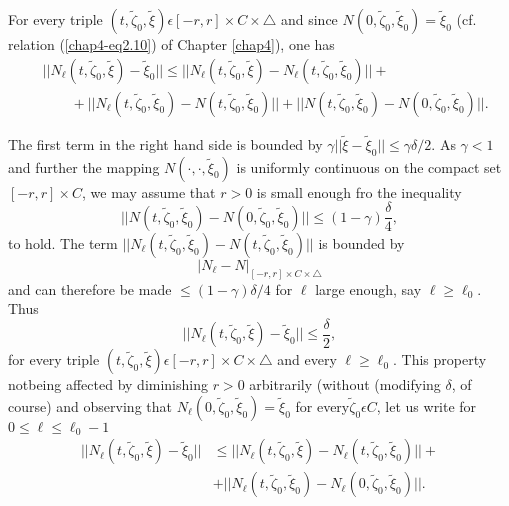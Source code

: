 For every triple $(t,  \widetilde{\zeta}_{0},  \widetilde{\xi})
\epsilon [-r, r] \times C \times \triangle$ and since $N(0,
\widetilde{\zeta}_{0},  \widetilde{\xi}_{0}) =  \widetilde{\xi}_{0}$
(cf. relation (\ref{chap4-eq2.10}) of Chapter \ref{chap4}), one has
\begin{align*}
& ||N_{\ell}(t,  \widetilde{\zeta}_{0},  \widetilde{\xi}) -
\widetilde{\xi}_{0}||  \leq ||N_{\ell}(t,  \widetilde{\zeta}_{0},
\widetilde{\xi}) - N_{\ell}(t,  \widetilde{\zeta}_{0},
\widetilde{\xi}_{0})|| +\\
& \qquad + ||N_{\ell}(t,  \widetilde{\zeta}_{0},  \widetilde{\xi}_{0}) - N (t , \widetilde{\zeta}_0, \widetilde{\xi}_0) || +
||N(t,  \widetilde{\zeta}_{0},  \widetilde{\xi}_{0}) -N(0,
\widetilde{\zeta}_{0},  \widetilde{\xi}_{0})||.
\end{align*}

The first term in the right hand side is bounded by $\gamma ||
\widetilde{\xi} -  \widetilde{\xi}_{0}|| \leq \gamma \delta / 2$. As
$\gamma < 1$ and further the mapping $N(\cdot, \cdot,
\widetilde{\xi}_{0})$ is uniformly continuous on the compact set $[-r,
r] \times C$, we may assume that $r > 0$ is small enough fro the
inequality
$$
||N(t,  \widetilde{\zeta}_{0},  \widetilde{\xi}_{0}) - N(0,
\widetilde{\zeta}_{0},  \widetilde{\xi}_{0})|| \leq (1 - \gamma)
\frac{\delta}{4}, 
$$
to hold. The term $||N_{\ell}(t,  \widetilde{\zeta}_{0},
\widetilde{\xi}_{0}) - N(t, \widetilde{\zeta}_{0},
\widetilde{\xi}_{0})||$ is bounded by 
$$|N_{\ell} - N|_{[-r, r] \times
  C \times \triangle}$$ 
and can therefore be made $\leq (1 -
\gamma)\delta / 4$ for $\ell$ large enough, say $\ell \geq
\ell_{0}$. Thus
$$
||N_{\ell}(t,  \widetilde{\zeta}_{0},  \widetilde{\xi}) -
\widetilde{\xi}_{0}|| \leq \frac{\delta}{2},
$$
for every triple $(t,  \widetilde{\zeta}_{0},  \widetilde{\xi})
\epsilon [-r, r] \times C \times \triangle$ and every $\ell \geq
\ell_{0}$. This property notbeing affected by diminishing $r > 0$
arbitrarily (without (modifying $\delta$, of course) and observing
that $N_{\ell} (0,  \widetilde{\zeta}_{0},  \widetilde{\xi}_{0}) =
\widetilde{\xi}_{0}$ for every\pageoriginale $ \widetilde{\zeta}_{0}
\epsilon C$, let us write for $0 \leq \ell \leq \ell_{0} - 1$
\begin{align*}
||N_{\ell} (t,  \widetilde{\zeta}_{0},  \widetilde{\xi}) -
\widetilde{\xi}_{0}|| & \leq ||N_{\ell} (t,  \widetilde{\zeta}_{0},
\widetilde{\xi}) - N_{\ell}(t,  \widetilde{\zeta}_{0},
\widetilde{\xi}_{0}) || + \\
& + ||N_{\ell} (t,  \widetilde{\zeta}_{0},  \widetilde{\xi}_{0}) -
N_{\ell}(0,  \widetilde{\zeta}_{0},  \widetilde{\xi}_{0})||.
\end{align*}

